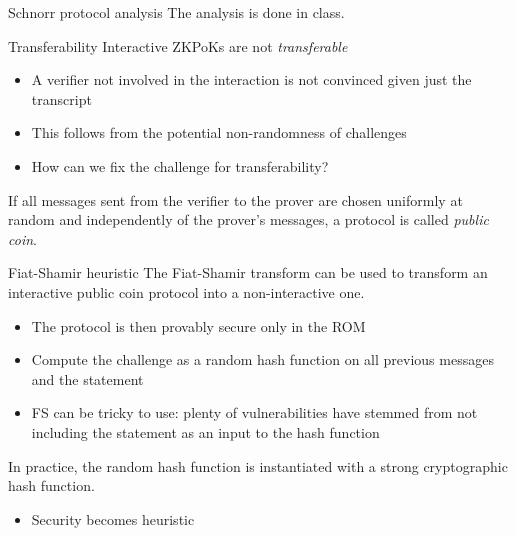 \begin{frame}{Schnorr protocol analysis}
  The analysis is done in class.
\end{frame}

\begin{frame}{Transferability}
  Interactive ZKPoKs are not \emph{transferable}
  \begin{itemize}
    \item A verifier not involved in the interaction is not convinced given just the transcript
    \item This follows from the potential non-randomness of challenges
    \item How can we fix the challenge for transferability?
  \end{itemize}

  \vspace*{1em}

  \pause
  If all messages sent from the verifier to the prover are chosen uniformly at random and independently of the prover's messages, a protocol is called \emph{public coin}.
\end{frame}

\begin{frame}{Fiat-Shamir heuristic}
  The Fiat-Shamir transform can be used to transform an interactive public coin protocol into a non-interactive one.
  \begin{itemize}[<+(1)->]
    \item The protocol is then provably secure only in the ROM
    \item Compute the challenge as a random hash function on all previous messages and the statement
    \item FS can be tricky to use: plenty of vulnerabilities have stemmed from not including the statement as an input to the hash function
  \end{itemize}

  \pause
  In practice, the random hash function is instantiated with a strong cryptographic hash function.
  \begin{itemize}[<+(1)->]
    \item Security becomes heuristic
  \end{itemize}
\end{frame}


